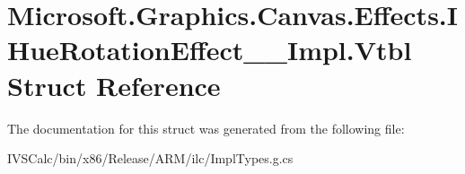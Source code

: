 \hypertarget{struct_microsoft_1_1_graphics_1_1_canvas_1_1_effects_1_1_i_hue_rotation_effect_____impl_1_1_vtbl}{}\section{Microsoft.\+Graphics.\+Canvas.\+Effects.\+I\+Hue\+Rotation\+Effect\+\_\+\+\_\+\+Impl.\+Vtbl Struct Reference}
\label{struct_microsoft_1_1_graphics_1_1_canvas_1_1_effects_1_1_i_hue_rotation_effect_____impl_1_1_vtbl}


The documentation for this struct was generated from the following file\+:\begin{DoxyCompactItemize}
\item 
I\+V\+S\+Calc/bin/x86/\+Release/\+A\+R\+M/ilc/Impl\+Types.\+g.\+cs\end{DoxyCompactItemize}
